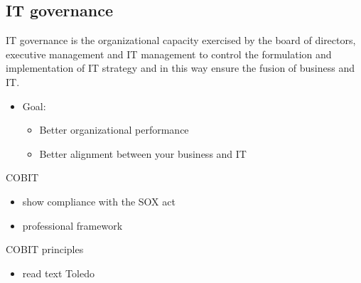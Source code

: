 \documentclass{article}
\begin{document}
\subsection{IT governance}

IT governance is the organizational capacity exercised by the board of directors, executive management and IT management to control the formulation and implementation of IT strategy and in this way ensure the fusion of business and IT.

\begin{itemize}
\item  Goal:

\begin{itemize}
\item  Better organizational performance

\item  Better alignment between your business and IT
\end{itemize}
\end{itemize}

COBIT 

\begin{itemize}
\item  show compliance with the SOX act

\item  professional framework
\end{itemize}

COBIT principles

\begin{itemize}
\item  read text Toledo
\end{itemize}
\end{document}
